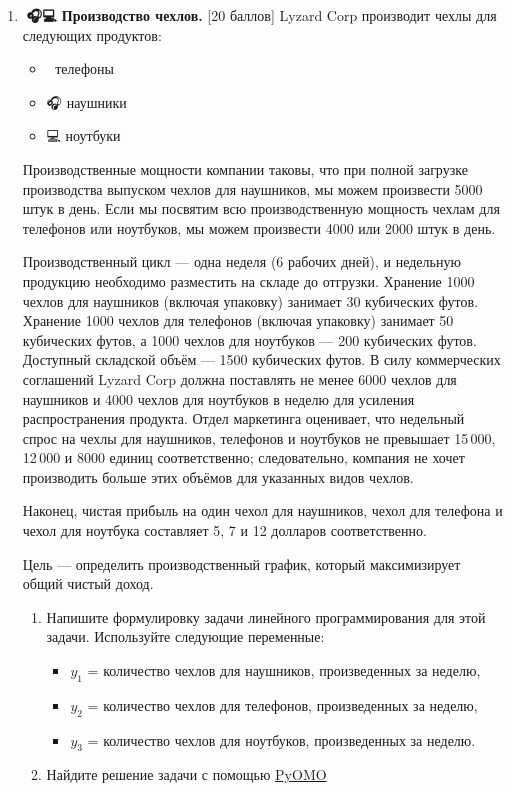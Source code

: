 \documentclass[
  russian,
  letterpaper,
  DIV=11,
  numbers=noendperiod]{scrartcl}
\providecommand{\tightlist}{%
  \setlength{\itemsep}{0pt}\setlength{\parskip}{0pt}}
\begin{document}
\begin{enumerate}
\def\labelenumi{\arabic{enumi}.}
\item
  \textbf{📱🎧💻 Производство чехлов.} {[}20 баллов{]} Lyzard Corp
  производит чехлы для следующих продуктов:

  \begin{itemize}
  \tightlist
  \item
    📱 телефоны
  \item
    🎧 наушники
  \item
    💻 ноутбуки
  \end{itemize}

  Производственные мощности компании таковы, что при полной загрузке
  производства выпуском чехлов для наушников, мы можем произвести 5000
  штук в день. Если мы посвятим всю производственную мощность чехлам для
  телефонов или ноутбуков, мы можем произвести 4000 или 2000 штук в
  день.

  Производственный цикл --- одна неделя (6 рабочих дней), и недельную
  продукцию необходимо разместить на складе до отгрузки. Хранение 1000
  чехлов для наушников (включая упаковку) занимает 30 кубических футов.
  Хранение 1000 чехлов для телефонов (включая упаковку) занимает 50
  кубических футов, а 1000 чехлов для ноутбуков --- 200 кубических
  футов. Доступный складской объём --- 1500 кубических футов. В силу
  коммерческих соглашений Lyzard Corp должна поставлять не менее 6000
  чехлов для наушников и 4000 чехлов для ноутбуков в неделю для усиления
  распространения продукта. Отдел маркетинга оценивает, что недельный
  спрос на чехлы для наушников, телефонов и ноутбуков не превышает
  15\,000, 12\,000 и 8000 единиц соответственно; следовательно, компания
  не хочет производить больше этих объёмов для указанных видов чехлов.

  Наконец, чистая прибыль на один чехол для наушников, чехол для
  телефона и чехол для ноутбука составляет 5, 7 и 12 долларов
  соответственно.

  Цель --- определить производственный график, который максимизирует
  общий чистый доход.

  \begin{enumerate}
  \def\labelenumii{\arabic{enumii}.}
  \item
    Напишите формулировку задачи линейного программирования для этой
    задачи. Используйте следующие переменные:

    \begin{itemize}
    \tightlist
    \item
      \(y_1\) = количество чехлов для наушников, произведенных за
      неделю,\\
    \item
      \(y_2\) = количество чехлов для телефонов, произведенных за
      неделю,\\
    \item
      \(y_3\) = количество чехлов для ноутбуков, произведенных за
      неделю.
    \end{itemize}
  \item
    Найдите решение задачи с помощью \href{http://www.pyomo.org}{PyOMO}


\end{enumerate}
\end{enumerate}
\end{document}
